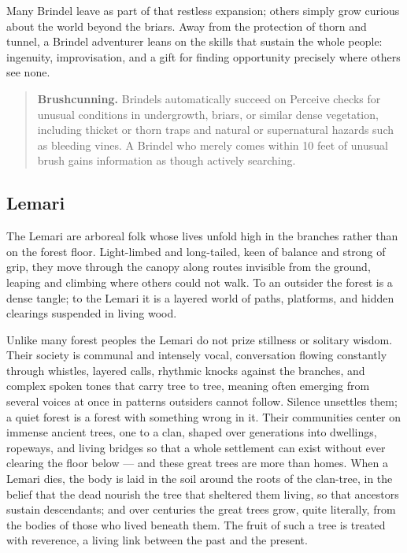 Many Brindel leave as part of that restless expansion; others simply grow curious about the world beyond the briars. Away from the protection of thorn and tunnel, a Brindel adventurer leans on the skills that sustain the whole people: ingenuity, improvisation, and a gift for finding opportunity precisely where others see none.

\begin{quote}
\textbf{Brushcunning.} Brindels automatically succeed on Perceive checks for unusual conditions in undergrowth, briars, or similar dense vegetation, including thicket or thorn traps and natural or supernatural hazards such as bleeding vines. A Brindel who merely comes within 10 feet of unusual brush gains information as though actively searching.
\end{quote}

\subsection{Lemari}

The Lemari are arboreal folk whose lives unfold high in the branches rather than on the forest floor. Light-limbed and long-tailed, keen of balance and strong of grip, they move through the canopy along routes invisible from the ground, leaping and climbing where others could not walk. To an outsider the forest is a dense tangle; to the Lemari it is a layered world of paths, platforms, and hidden clearings suspended in living wood.

Unlike many forest peoples the Lemari do not prize stillness or solitary wisdom. Their society is communal and intensely vocal, conversation flowing constantly through whistles, layered calls, rhythmic knocks against the branches, and complex spoken tones that carry tree to tree, meaning often emerging from several voices at once in patterns outsiders cannot follow. Silence unsettles them; a quiet forest is a forest with something wrong in it. Their communities center on immense ancient trees, one to a clan, shaped over generations into dwellings, ropeways, and living bridges so that a whole settlement can exist without ever clearing the floor below --- and these great trees are more than homes. When a Lemari dies, the body is laid in the soil around the roots of the clan-tree, in the belief that the dead nourish the tree that sheltered them living, so that ancestors sustain descendants; and over centuries the great trees grow, quite literally, from the bodies of those who lived beneath them. The fruit of such a tree is treated with reverence, a living link between the past and the present.

